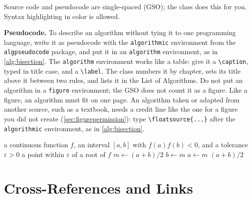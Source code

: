 Source code and pseudocode are single-spaced (GSO); the class does this for you. Syntax highlighting in color is allowed.

\textbf{Pseudocode.} To describe an algorithm without tying it to one programming language, write it as pseudocode with the \texttt{algorithmic} environment from the \texttt{algpseudocode} package, and put it in an \texttt{algorithm} environment, as in \cref{alg:bisection}. The \texttt{algorithm} environment works like a table: give it a \verb+\caption+, typed in title case, and a \verb+\label+. The class numbers it by chapter, sets its title above it between two rules, and lists it in the List of Algorithms. Do not put an algorithm in a \texttt{figure} environment; the GSO does not count it as a figure. Like a figure, an algorithm must fit on one page. An algorithm taken or adapted from another source, such as a textbook, needs a credit line like the one for a figure you did not create (\cref{sec:figurepermission}): type \verb+\floatsource{...}+ after the \texttt{algorithmic} environment, as in \cref{alg:bisection}.

\begin{algorithm}
\caption{Bisection Method for a Root of a Continuous Function}
\label{alg:bisection}
\begin{algorithmic}[1]
\Require a continuous function $f$, an interval $[a,b]$ with $f(a)f(b)<0$, and a tolerance $\varepsilon>0$
\Ensure a point within $\varepsilon$ of a root of $f$
  \State $m \gets (a+b)/2$
    \State $b \gets m$
  \Else
    \State $a \gets m$
  \EndIf
\EndWhile
\State \Return $(a+b)/2$
\end{algorithmic}
\end{algorithm}

\section{Cross-References and Links}
\label{sec:crossrefs}

